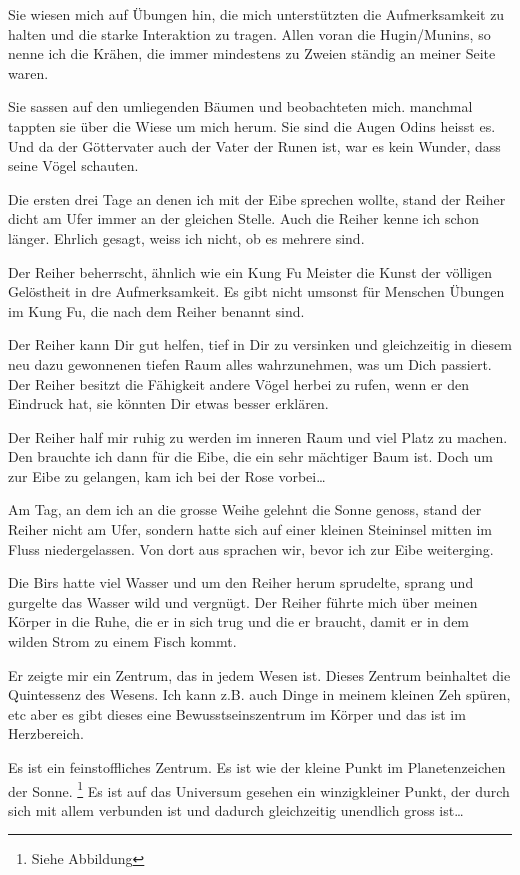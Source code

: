\documentclass[11pt,titlepage,a5paper]{book}
\begin{document}
Sie wiesen mich auf Übungen hin, die mich unterstützten die Aufmerksamkeit zu halten und die starke Interaktion zu tragen. Allen voran die Hugin/Munins, so nenne ich die Krähen, die immer mindestens zu Zweien ständig an meiner Seite waren.

Sie sassen auf den umliegenden Bäumen und beobachteten mich. manchmal tappten sie über die Wiese um mich herum. Sie sind die Augen Odins heisst es. Und da der Göttervater auch der Vater der Runen ist, war es kein Wunder, dass seine Vögel schauten.

Die ersten drei Tage an denen ich mit der Eibe sprechen wollte, stand der Reiher dicht am Ufer immer an der gleichen Stelle. Auch die Reiher kenne ich schon länger. Ehrlich gesagt, weiss ich nicht, ob es mehrere sind.

Der Reiher beherrscht, ähnlich wie ein Kung Fu Meister die Kunst der völligen Gelöstheit in dre Aufmerksamkeit. Es gibt nicht umsonst für Menschen Übungen im Kung Fu, die nach dem Reiher benannt sind.

Der Reiher kann Dir gut helfen, tief in Dir zu versinken und gleichzeitig in diesem neu dazu gewonnenen tiefen Raum alles wahrzunehmen, was um Dich passiert. Der Reiher besitzt die Fähigkeit andere Vögel herbei zu rufen, wenn er den Eindruck hat, sie könnten Dir etwas besser erklären.

Der Reiher half mir ruhig zu werden im inneren Raum und viel Platz zu machen. Den brauchte ich dann für die Eibe, die ein sehr mächtiger Baum ist. Doch um zur Eibe zu gelangen, kam ich bei der Rose vorbei\dots

Am Tag, an dem ich an die grosse Weihe gelehnt die Sonne genoss, stand der Reiher nicht am Ufer, sondern hatte sich auf einer kleinen Steininsel mitten im Fluss niedergelassen. Von dort aus sprachen wir, bevor ich zur Eibe weiterging.

Die Birs hatte viel Wasser und um den Reiher herum sprudelte, sprang und gurgelte das Wasser wild und vergnügt. Der Reiher führte mich über meinen Körper in die Ruhe, die er in sich trug und die er braucht, damit er in dem wilden Strom zu einem Fisch kommt.

Er zeigte mir ein Zentrum, das in jedem Wesen ist. Dieses Zentrum beinhaltet die Quintessenz des Wesens. Ich kann z.B. auch Dinge in meinem kleinen Zeh spüren, etc aber es gibt dieses eine Bewusstseinszentrum im Körper und das ist im Herzbereich.

Es ist ein feinstoffliches Zentrum. Es ist wie der kleine Punkt im Planetenzeichen der Sonne. \footnote{Siehe Abbildung} Es ist auf das Universum gesehen ein winzigkleiner Punkt, der durch sich mit allem verbunden ist und dadurch gleichzeitig unendlich gross ist\dots
\end{document}
